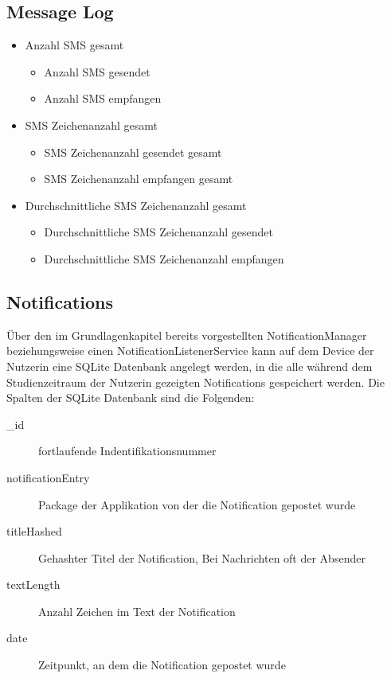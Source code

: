 \subsection{Message Log}

\begin{itemize}
    \item Anzahl SMS gesamt
    \begin{itemize}
        \item Anzahl SMS gesendet
        \item Anzahl SMS empfangen
    \end{itemize}

    \item SMS Zeichenanzahl gesamt
    \begin{itemize}
        \item SMS Zeichenanzahl gesendet gesamt
        \item SMS Zeichenanzahl empfangen gesamt
    \end{itemize}

    \item Durchschnittliche SMS Zeichenanzahl gesamt
    \begin{itemize}
        \item Durchschnittliche SMS Zeichenanzahl gesendet
        \item Durchschnittliche SMS Zeichenanzahl empfangen
    \end{itemize}

\end{itemize}


\subsection{Notifications}


Über den im Grundlagenkapitel bereits vorgestellten NotificationManager beziehungsweise einen NotificationListenerService kann auf dem Device der Nutzerin eine SQLite Datenbank angelegt werden,
in die alle während dem Studienzeitraum der Nutzerin gezeigten Notifications gespeichert werden.
Die Spalten der SQLite Datenbank sind die Folgenden:
\begin{description}
    \item [\_id] fortlaufende Indentifikationsnummer
    \item [notificationEntry] Package der Applikation von der die Notification gepostet wurde
    \item [titleHashed] Gehashter Titel der Notification, Bei Nachrichten oft der Absender
    \item [textLength] Anzahl Zeichen im Text der Notification
    \item [date] Zeitpunkt, an dem die Notification gepostet wurde
\end{description}

